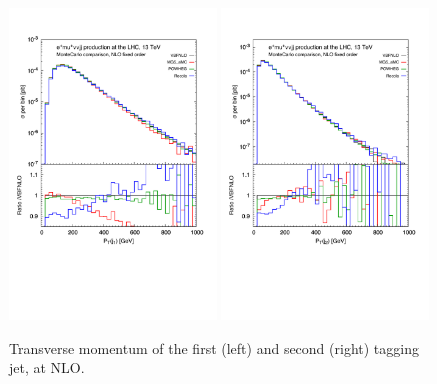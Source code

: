 \documentclass[a4paper,10pt]{report}
\begin{document}
\begin{figure}[h!]
   \centering
   \includegraphics[width=0.49\textwidth,angle=0,clip=true,trim={0.4cm 4.cm 0.6cm 1.5cm}]{figures/ptj1_NLO.pdf}
   \includegraphics[width=0.49\textwidth,angle=0,clip=true,trim={0.4cm 4.cm 0.6cm 1.5cm}]{figures/ptj2_NLO.pdf}
\caption{\label{fig:ptj1-2NLO}Transverse momentum of the first (left) and second (right) tagging jet, at NLO.
}
\end{figure}
%
\end{document}
